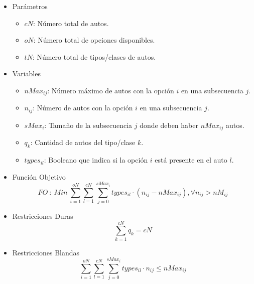 \begin{itemize}
	\item Parámetros
	\begin{itemize}
		\item $cN$: Número total de autos.
		\item $oN$: Número total de opciones disponibles.
		\item $tN$: Número total de tipos/clases de autos.
	\end{itemize}
	\item Variables
	\begin{itemize}
		\item $nMax_{ij}$: Número máximo de autos con la opción $i$ en una subsecuencia $j$.
		\item $n_{ij}$: Número de autos con la opción $i$ en una subsecuencia $j$.
		\item $sMax_{i}$: Tamaño de la subsecuencia $j$ donde deben haber $nMax_{ij}$ autos.
		\item $q_{k}$: Cantidad de autos del tipo/clase $k$.
		\item $types_{il}$: Booleano que indica si la opción $i$ está presente en el auto $l$.
	\end{itemize}
	\item Función Objetivo
	$$FO\ :\ Min\ \sum\limits_{i=1}^{oN} \sum\limits_{l=1}^{cN} \sum\limits_{j=0}^{sMax_{i}} types_{il}\cdot (n_{ij} - nMax_{ij}), \forall n_{ij} > nM_{ij}$$
	\item Restricciones Duras
	$$\sum\limits_{k=1}^{cN} q_{k} = cN$$
	\item Restricciones Blandas
	$$\sum\limits_{i=1}^{oN} \sum\limits_{l=1}^{cN} \sum\limits_{j=0}^{sMax_{i}} types_{il}\cdot n_{ij} \leq nMax_{ij}$$
\end{itemize}

